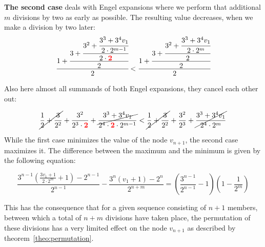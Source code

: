 \documentclass[12pt]{amsart}
\theoremstyle{definition}
\begin{document}
\par\bigskip\noindent
\textbf{The second case} deals with Engel expansions where we perform that additional $m$ divisions by two as early as possible. The resulting value decreases, when we make a division by two later:
\[
\cfrac{1+\cfrac{3+\cfrac{3^2+\cfrac{3^3+3^4v_1}{2\cdot2^{m-1}}}{2\cdot\textcolor{red}{\mathbf{2}}}}{2}}{2}
<
\cfrac{1+\cfrac{3+\cfrac{3^2+\cfrac{3^3+3^4v_1}{2\cdot2^m}}{2}}{2}}{2}
\]

\par\bigskip
Also here almost all summands of both Engel expansions, they cancel each other out:

\[
\cancel{\frac{1}{2}+\frac{3}{2^2}}+\frac{3^2}{2^3\cdot\textcolor{red}{\mathbf{2}}}+\cancel{\frac{3^3+3^4v_1}{2^4\cdot\textcolor{red}{\mathbf{2}}\cdot2^{m-1}}}
<
\cancel{\frac{1}{2}+\frac{3}{2^2}}+\frac{3^2}{2^3}+\cancel{\frac{3^3+3^4v_1}{2^4\cdot2^m}}
\]

\par\medskip
While the first case minimizes the value of the node $v_{n+1}$, the second case maximizes it. The difference between the maximum and the minimum is given by the following equation:

\[
\frac{3^{n-1}\left(\frac{3v_1+1}{2\cdot2^m}+1\right)-2^{n-1}}{2^{n-1}}-\frac{3^n\left(v_1+1\right)-2^n}{2^{n+m}}=\left(\frac{3^{n-1}}{2^{n-1}}-1\right)\left(1-\frac{1}{2^m}\right)
\]

\par\medskip
This has the consequence that for a given sequence consisting of $n+1$ members, between which a total of $n+m$ divisions have taken place, the permutation of these divisions has a very limited effect on the node $v_{n+1}$ as described by theorem~\ref{theo:permutation}.
\end{document}
